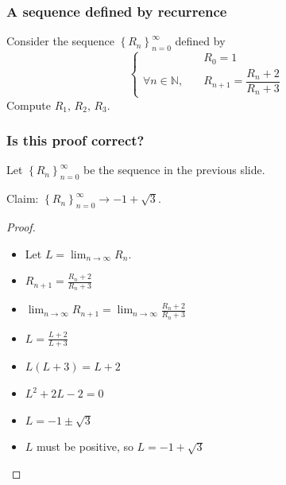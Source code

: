 \begin{frame}[t]
	\frametitle{A sequence defined by recurrence}

	Consider the sequence $\displaystyle \left\{ R_{n} \right\}_{n=0}^{\infty}$
	defined by
	\begin{equation*}
		\begin{cases}
			                                & R_{0}= 1                           \\
			\forall n \in \mathbb{N}, \quad & R_{n+1}= \dfrac{ R_n + 2}{R_n + 3}
		\end{cases}
	\end{equation*}
	Compute $\displaystyle R_{1}, \, R_{2}, \, R_{3}$.
\end{frame}

\begin{frame}[t]
	\fontsize{13}{13}\selectfont
	\frametitle{Is this proof correct?}
	Let $\displaystyle \left\{ R_{n} \right\}_{n=0}^{\infty}$ be the sequence in
	the previous slide.
	\begin{block}{Claim:}
		$\displaystyle \left\{ R_{n} \right\}_{n=0}^{\infty}\longrightarrow -1 + \sqrt{3}$.
	\end{block}
	\begin{proof}
		\begin{multicols}{2}
			\begin{itemize}
				\item Let $\displaystyle L = \lim_{n \to \infty}R_{n}$.

				\item $\displaystyle R_{n+1}= \frac{R_{n}+ 2}{ R_{n}+ 3}$

				\item $\displaystyle \lim_{n \to \infty }R_{n+1}= \lim_{n \to \infty }\frac{R_{n}+
					2}{ R_{n}+ 3}$

				\item $\displaystyle L = \frac{L + 2}{ L + 3}$

				\item $\displaystyle L(L+3) = L + 2$

				\item $\displaystyle L^{2}+2L - 2 = 0$

				\item $\displaystyle L = -1 \pm \sqrt{3}$

				\item $\displaystyle L$ must be positive, so
					$\displaystyle L = -1 + \sqrt{3}$
			\end{itemize}
		\end{multicols}
	\end{proof}
\end{frame}

